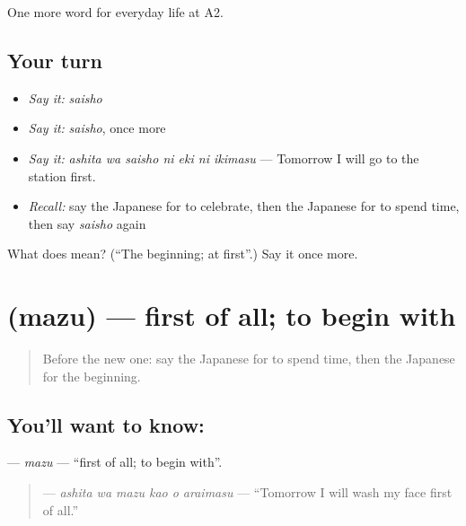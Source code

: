 \begin{grammarlens}[title={What you've built}]
One more word for everyday life at A2.
\end{grammarlens}

\subsection*{Your turn}
\begin{itemize}
\raggedright
  \item \emph{Say it:} \emph{saisho}
  \item \emph{Say it:} \emph{saisho}, once more
  \item \emph{Say it:} \emph{ashita wa saisho ni eki ni ikimasu} — Tomorrow I will go to the station first.
  \item \emph{Recall:} say the Japanese for to celebrate, then the Japanese for to spend time, then say \emph{saisho} again
\end{itemize}

\begin{tcolorbox}[breakable,colback=teal!4,colframe=teal!35!black,title={Before you move on}]
What does  mean? (\textquotedblleft{}The beginning; at first\textquotedblright{}.) Say it once more.
\end{tcolorbox}
\section[\texorpdfstring{\ja{まず} (mazu)}{まず (mazu)}]{ (mazu) — first of all; to begin with}

\label{lesson:JA-C171-mazu}



\begin{quote}
Before the new one: say the Japanese for to spend time, then the Japanese for the beginning.
\end{quote}

\subsection*{You'll want to know: }
\textbf{} — \emph{mazu} — \textquotedblleft{}first of all; to begin with\textquotedblright{}.

\begin{quote}
\textbf{   } — \emph{ashita wa mazu kao o araimasu} — \textquotedblleft{}Tomorrow I will wash my face first of all.\textquotedblright{}
\end{quote}

